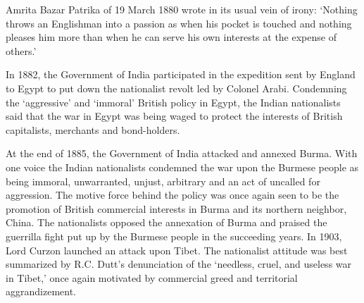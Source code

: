 \begin{multicols}{2}
Amrita Bazar Patrika of 19 March 1880 wrote in its usual vein of irony: `Nothing throws an Englishman into a passion as when his pocket is touched and nothing pleases him more than when he can serve his own interests at the expense of others.' 

In 1882, the Government of India participated in the expedition sent by England to Egypt to put down the nationalist revolt led by Colonel Arabi. Condemning the `aggressive' and `immoral' British policy in Egypt, the Indian nationalists said that the war in Egypt was being waged to protect the interests of British capitalists, merchants and bond-holders. 

At the end of 1885, the Government of India attacked and annexed Burma. With one voice the Indian nationalists condemned the war upon the Burmese people as being immoral, unwarranted, unjust, arbitrary and an act of uncalled for aggression. The motive force behind the policy was once again seen to be the promotion of British commercial interests in Burma and its northern neighbor, China. The nationalists opposed the annexation of Burma and praised the guerrilla fight put up by the Burmese people in the succeeding years. In 1903, Lord Curzon launched an attack upon Tibet. The nationalist attitude was best summarized by R.C. Dutt's denunciation of the `needless, cruel, and useless war in Tibet,' once again motivated by commercial greed and territorial aggrandizement. 


\end{multicols}
